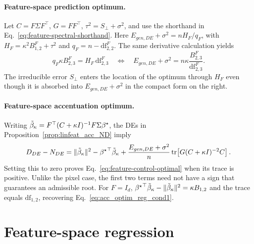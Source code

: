\paragraph{Feature-space prediction optimum.}
Let $C=F\Sigma F^\top$, $G=FF^\top$,
$\tau^2=S_\perp+\sigma^2$, and use the shorthand in
Eq.~\ref{eq:feature-spectral-shorthand}. Here
$E_{gen,DE}+\sigma^2=nH_F/q_F$, with
$H_F=\kappa^2B^F_{1,2}+\tau^2$ and
$q_F=n-\mathrm{df}^F_{2,2}$. The same derivative calculation yields
\begin{equation}
q_F\kappa B^F_{2,3}=H_F\,\mathrm{df}^F_{2,3}
\quad\Longleftrightarrow\quad
E_{gen,DE}+\sigma^2=n\kappa\frac{B^F_{2,3}}{\mathrm{df}^F_{2,3}}.
\label{eq:appendix-feature-prediction-stationary}
\end{equation}
The irreducible error $S_\perp$ enters the location of the optimum
through $H_F$ even though it is absorbed into $E_{gen,DE}+\sigma^2$
in the compact form on the right.

\paragraph{Feature-space accentuation optimum.}
Writing $\tilde\beta_\kappa=F^\top(C+\kappa I)^{-1}F\Sigma{\beta^{\star}}$,
the DEs in Proposition~\ref{prop:linfeat_acc_ND} imply
\begin{equation}
D_{DE}-N_{DE}
=\|\tilde\beta_\kappa\|^2-{\beta^{\star}}^\top\tilde\beta_\kappa
+\frac{E_{gen,DE}+\sigma^2}{n}
\operatorname{tr}\!\left[G(C+\kappa I)^{-2}C\right].
\label{eq:appendix-feature-d-minus-n}
\end{equation}
Setting this to zero proves Eq.~\ref{eq:feature-control-optimal}
when its trace is positive. Unlike the pixel case, the first two terms
need not have a sign that guarantees an admissible root. For $F=I_d$,
${\beta^{\star}}^\top\tilde\beta_\kappa-\|\tilde\beta_\kappa\|^2
=\kappa B_{1,2}$ and the trace equals $\mathrm{df}_{1,2}$,
recovering Eq.~\ref{eq:acc_optim_reg_cond1}.
\endgroup

% 


\section{Feature-space regression}
\label{sec:app-feature-regression}

